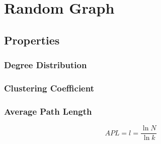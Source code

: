 \documentclass[a4paper,titlepage,11pt]{article}
\begin{document}
\section{Random Graph}
\subsection{Properties}
\subsubsection{Degree Distribution}
  
\subsubsection{Clustering Coefficient}

\subsubsection{Average Path Length}
\[
  APL = l = \frac{\ln{N}}{\ln{k}}
\]
\end{document}
